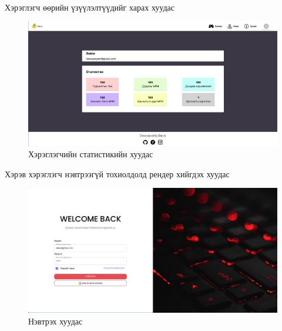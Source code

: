 Хэрэглэгч өөрийн үзүүлэлтүүдийг харах хуудас
\begin{figure}[h]
	\centering
	\includegraphics[width=13cm]{images/result/statisticspage.png}
	\caption{Хэрэглэгчийн статистикийн хуудас}
	\label{fig:results}
\end{figure}

Хэрэв хэрэглэгч нэвтрээгүй тохиолдолд рендер хийгдэх хуудас
\begin{figure}[h]
	\centering
	\includegraphics[width=13cm]{images/result/loginpage.png}
	\caption{Нэвтрэх хуудас}
	\label{fig:results}
\end{figure}